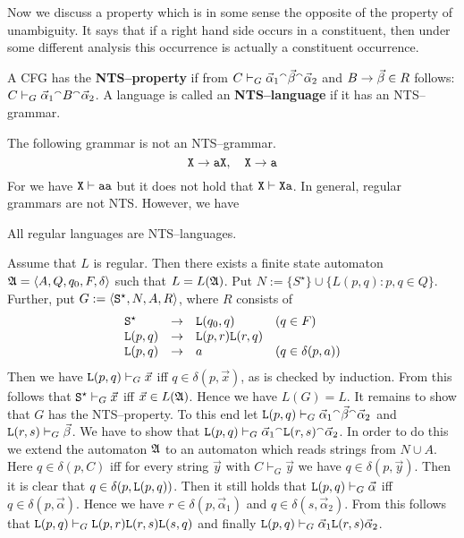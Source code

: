 Now we discuss a property which is in some sense the opposite of the 
property of unambiguity. It says that if a right hand side occurs in a
constituent, then under some different analysis this occurrence is
actually a constituent occurrence.
\begin{defn}
A CFG has the \textbf{NTS--pro\-per\-ty} if from 
$C \vdash_G \vec{\alpha}_1 {^{\smallfrown}} \vec{\beta} {^{\smallfrown}} \vec{\alpha}_2$ 
and $B \rightarrow \vec{\beta} \in R$ follows: $C \vdash_G \vec{\alpha}_1
{^{\smallfrown}} B {^{\smallfrown}} \vec{\alpha}_2$. A language is called
an \textbf{NTS--language} if it has an NTS--grammar.
\end{defn}
The following grammar is not an NTS--grammar.
\begin{equation}
\mbox{\tt X} \rightarrow \mbox{\tt aX}, \quad \mbox{\tt X} \rightarrow \mbox{\tt a}
\end{equation}
For we have $\mbox{\tt X} \vdash \mbox{\tt aa}$ but it does
not hold that $\mbox{\tt X} \vdash \mbox{\tt Xa}$.
In general, regular grammars are not NTS. However, we have
\begin{thm}
All regular languages are NTS--languages.
\end{thm}
\proofbeg
Assume that $L$ is regular. Then there exists a finite state automaton
$\mathfrak{A} = \langle A, Q, q_0, F, \delta\rangle$ such that $L = L(\mathfrak{A})$.
Put $N := \{S^{\star}\} \cup \{L(p,q) : p, q \in Q\}$. 
Further, put $G := \langle \mbox{\tt S}^{\star}, N, A, R\rangle$, where 
$R$ consists of 
\begin{equation}
\begin{array}{l@{\quad \pf\quad}ll}
\mbox{\tt S}^{\star} & \mbox{\tt L}(q_0,q) & (q \in F) \\
\mbox{\tt L}(p,q)    & \mbox{\tt L}(p,r) \mbox{\tt L}(r,q) \\
\mbox{\tt L}(p,q)    & a           & (q \in \delta(p, a))
\end{array}
\end{equation}
Then we have $\mbox{\tt L}(p,q) \vdash_G \vec{x}$  iff
$q \in \delta(p,\vec{x})$, as is checked by induction.
From this follows that $\mbox{\tt S}^{\star} \vdash_G \vec{x}$
iff $\vec{x} \in L(\mathfrak{A})$. Hence we have $L(G) = L$. It
remains to show that $G$ has the NTS--property.  To this end let
$\mbox{\tt L}(p,q) \vdash_G \vec{\alpha}_1 {^{\smallfrown}} \vec{\beta}
{^{\smallfrown}} \vec{\alpha}_2$ and $\mbox{\tt L}(r,s) \vdash_G \vec{\beta}$.
We have to show that $\mbox{\tt L}(p,q) \vdash_G \vec{\alpha}_1 %
\conc \mbox{\tt L}(r,s) \conc \vec{\alpha}_2$.  In order to do
this we extend the automaton $\mathfrak{A}$ to an automaton which reads
strings from $N \cup A$. Here $q \in \delta(p, C)$
iff for every string $\vec{y}$ with $C \vdash_G \vec{y}$
we have $q \in \delta(p, \vec{y})$. Then it is clear that
$q \in \delta(p, \mbox{\tt L}(p,q))$. Then it still holds that
$\mbox{\tt L}(p,q) \vdash_G \vec{\alpha}$ iff
$q \in \delta(p, \vec{\alpha})$. Hence we have
$r \in \delta(p, \vec{\alpha}_1)$ and
$q \in \delta(s, \vec{\alpha}_2)$. From this follows that
$\mbox{\tt L}(p,q) \vdash_G \mbox{\tt L}(p,r) \mbox{\tt L}(r,s)
\mbox{\tt L}(s,q)$ and finally
$\mbox{\tt L}(p,q) \vdash_G \vec{\alpha}_1 \mbox{\tt L}(r,s) \vec{\alpha}_2$.
\proofend

